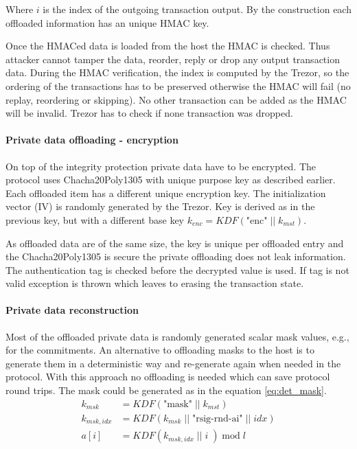 \documentclass[]{article}
\begin{document}
 Where $i$ is the index of the outgoing transaction output. By the construction each offloaded information has an unique HMAC key.

Once the HMACed data is loaded from the host the HMAC is checked. Thus attacker cannot tamper the data, reorder, reply or drop any output transaction data. During the HMAC verification, the index is computed by the Trezor, so the ordering of the transactions has to be preserved otherwise the HMAC will fail (no replay, reordering or skipping). No other transaction can be added as the HMAC will be invalid. Trezor has to check if none transaction was dropped.

\paragraph{Private data offloading - encryption}
On top of the integrity protection private data have to be encrypted.
The protocol uses Chacha20Poly1305 with unique purpose key as described earlier. Each offloaded item has a different unique encryption key.
The initialization vector (IV) is randomly generated by the Trezor. Key is derived as in the previous key, but with a different base key $k_{enc} = \textit{KDF}\left(\text{"enc"} \; || \; k_{mst}\right)$.

As offloaded data are of the same size, the key is unique per offloaded entry and the Chacha20Poly1305 is secure the private offloading does not leak information. The authentication tag is checked before the decrypted value is used. If tag is not valid exception is thrown which leaves to erasing the transaction state.

\paragraph{Private data reconstruction} \label{mask_reconstruction}
Most of the offloaded private data is randomly generated scalar mask values, e.g., for the commitments. An alternative to offloading masks to the host is to generate them in a deterministic way and re-generate again when needed in the protocol. With this approach no offloading is needed which can save protocol round trips. The mask could be generated as in the equation \ref{eq:det_mask}. 
\begin{equation}
\begin{split} \label{eq:det_mask}
k_{msk} &= \textit{KDF}\left(\text{"mask"} \; || \; k_{mst}\right)\\
k_{msk,idx} &= \textit{KDF}\left(k_{msk} \; || \; \text{"rsig-rnd-ai"} \; || \; idx \right)\\
a[i] &= KDF(k_{msk,idx} \; || \; i \;) \; \text{mod} \; l  \\
\end{split}
\end{equation}
\end{document}
